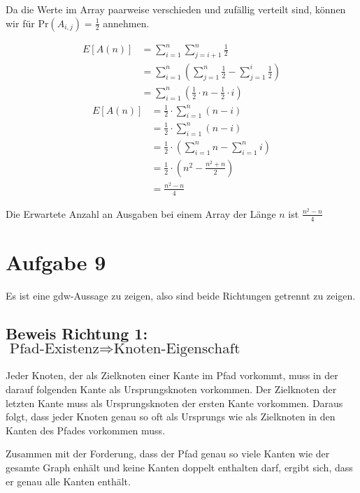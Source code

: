 \documentclass[parskip=half,a4paper]{scrartcl}
\begin{document}
Da die Werte im Array paarweise verschieden und zufällig verteilt sind, können wir für $\text{Pr}(A_{i,j}) = \frac{1}{2}$ annehmen.


\begin{equation}
\begin{aligned}
   E\left[A(n)\right] &= \sum_{i=1}^{n}{\sum_{j=i+1}^{n}{\frac{1}{2}}}\\
   &= \sum_{i=1}^{n}{\left(\sum_{j=1}^{n}{\frac{1}{2}} - \sum_{j=1}^{i}{\frac{1}{2}}\right)}\\
   &= \sum_{i=1}^{n}{\left(\frac{1}{2}\cdot n - \frac{1}{2}\cdot i\right)}
\end{aligned}
\end{equation}
\begin{equation}
\begin{aligned}
   E\left[A(n)\right] &= \frac{1}{2} \cdot \sum_{i=1}^{n}{\left(n - i\right)}\\
   &= \frac{1}{2} \cdot \sum_{i=1}^{n}{\left(n - i\right)}\\
   &= \frac{1}{2} \cdot \left(\sum_{i=1}^{n}{n} - \sum_{i=1}^{n}{i}\right)\\
   &= \frac{1}{2} \cdot \left(n^2 - \frac{n^2 + n}{2}\right)\\
   &= \frac{n^2 - n}{4}
\end{aligned}
\end{equation}

Die Erwartete Anzahl an Ausgaben bei einem Array der Länge $n$ ist $\frac{n^2 - n}{4}$

\section*{Aufgabe 9}

Es ist eine gdw-Aussage zu zeigen, also sind beide Richtungen getrennt zu zeigen.

\subsection*{Beweis Richtung 1: $\text{Pfad-Existenz} \Rightarrow \text{Knoten-Eigenschaft}$}

Jeder Knoten, der als Zielknoten einer Kante im Pfad vorkommt, muss in der darauf folgenden Kante als Ursprungsknoten vorkommen. Der Zielknoten der letzten Kante muss als Ursprungsknoten der ersten Kante vorkommen. Daraus folgt, dass jeder Knoten genau so oft als Ursprungs wie als Zielknoten in den Kanten des Pfades vorkommen muss.

Zusammen mit der Forderung, dass der Pfad genau so viele Kanten wie der gesamte Graph enhält und keine Kanten doppelt enthalten darf, ergibt sich, dass er genau alle Kanten enthält.
\end{document}
